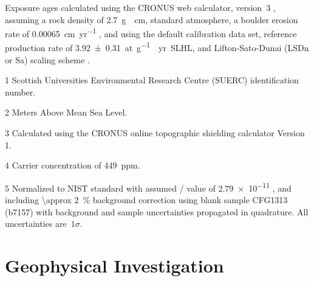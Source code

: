 \documentclass[utf8]{frontiersSCNS}
\begin{document}
\begin{table}
\begin{threeparttable}
  \begin{tablenotes}
    \footnotesize
  \item[]
    \hspace*{-0.2cm}
    Exposure ages calculated using the CRONUS web calculator, version~3 \citep[][\url{https://hess.ess.washington.edu}; version info -- wrapper: 3.0.2, get\_age: 3.0.2, muons: 1A, alpha = 1, validate: validate\_v2\_input.m - 3.0, const:3.0.4]{Balco+2008}, assuming a rock density of \SI{2.7}{g \per cm}, standard atmosphere, a boulder erosion rate of \SI{0.00065}{cm\per yr} \citep{wahrhaftig2019extent}, and using the default calibration data set, reference production rate of \SI{3.92 \pm 0.31}{at\per g \per yr SLHL}, and Lifton-Sato-Dunai (LSDn or Sa) scaling scheme \citep{lifton2014scaling,phillips2016cronus}.
  \item[1]
    Scottish Universities Environmental Research Centre (SUERC) identification number.  
  \item[2]
    Meters Above Mean Sea Level.
  \item[3]
    Calculated using the CRONUS online topographic shielding calculator Version 1.
  \item[4]
    Carrier  concentration of \SI{449}{ppm}.
  \item[5]
    Normalized to NIST standard with assumed / value of \num{2.79e-11} \cite{Nishiizumi+2007}, and including \SI{\approx 2}{\%} background correction using blank sample CFG1313 (b7157) with background and sample uncertainties propagated in quadrature. All uncertainties are~$1\sigma$. 
  \end{tablenotes}
\end{threeparttable}
\end{table}
 
\section{Geophysical Investigation}\label{sec:geophys}
\end{document}
